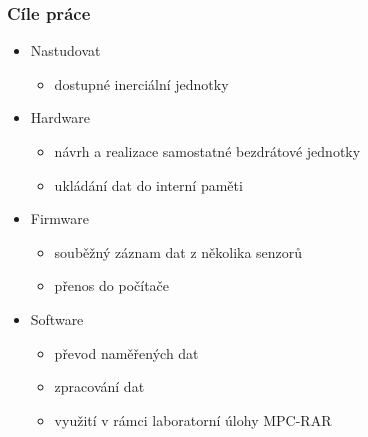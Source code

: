 \documentclass[%
  12pt,       				%
	t,                  %
	aspectratio=1610,   %
	unicode,						%
]{beamer}				    	%
\begin{document}
\disablenavigationsymbols

\maketitle

\begin{frame} 
	\frametitle{Cíle práce}
	\begin{itemize}
			\item Nastudovat
			\begin{itemize}
					\item dostupné inerciální jednotky
				\end{itemize}
			\item Hardware
				\begin{itemize}
					\item návrh a realizace samostatné bezdrátové jednotky
					\item ukládání dat do interní paměti
				\end{itemize}
			\item Firmware
				\begin{itemize}
					\item souběžný záznam dat z několika senzorů
					\item přenos do počítače
				\end{itemize}	
							\item Software
				\begin{itemize}
					\item převod naměřených dat
					\item zpracování dat
					\item využití v rámci laboratorní úlohy MPC-RAR
				\end{itemize}

	\end{itemize}
\end{frame}
\end{document}
